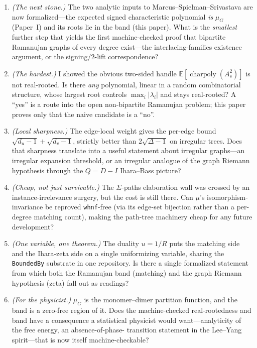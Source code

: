 \documentclass[11pt]{article}
\newcommand{\lean}[1]{{\def\_{\textunderscore\allowbreak}\texttt{#1}}}
\begin{document}
\begin{enumerate}\itemsep3pt
\item[\textbf{Q1}] \emph{(The next stone.)} The two analytic inputs to
  Marcus--Spielman--Srivastava are now formalized---the expected signed
  characteristic polynomial \emph{is} $\mu_G$ (Paper~I) and its roots lie in the
  band (this paper). What is the \emph{smallest} further step that yields the first
  machine-checked proof that bipartite Ramanujan graphs of every degree exist---the
  interlacing-families existence argument, or the signing/$2$-lift correspondence?
\item[\textbf{Q2}] \emph{(The hardest.)} I showed the obvious two-sided handle
  $\mathbb{E}[\operatorname{charpoly}(A_s^2)]$ is not real-rooted. Is there
  \emph{any} polynomial, linear in a random combinatorial structure, whose largest
  root controls $\max_i|\lambda_i|$ and stays real-rooted? A ``yes'' is a route into
  the open non-bipartite Ramanujan problem; this paper proves only that the naive
  candidate is a ``no''.
\item[\textbf{Q3}] \emph{(Local sharpness.)} The edge-local weight gives the
  per-edge bound $\sqrt{d_u-1}+\sqrt{d_v-1}$, strictly better than $2\sqrt{\Delta-1}$
  on irregular trees. Does that sharpness translate into a useful statement about
  irregular graphs---an irregular expansion threshold, or an irregular analogue of
  the graph Riemann hypothesis through the $Q=D-I$ Ihara--Bass picture?
\item[\textbf{Q4}] \emph{(Cheap, not just survivable.)} The $\Sigma$-paths
  elaboration wall was crossed by an instance-irrelevance surgery, but the cost is
  still there. Can $\mu$'s isomorphism-invariance be reproved \lean{whnf}-free (via
  its edge-set bijection rather than a per-degree matching count), making the
  path-tree machinery cheap for any future development?
\item[\textbf{Q5}] \emph{(One variable, one theorem.)} The duality $u=1/R$ puts the
  matching side and the Ihara-zeta side on a single uniformizing variable, sharing
  the \lean{BoundedBy} substrate in one repository. Is there a single formalized
  statement from which both the Ramanujan band (matching) and the graph Riemann
  hypothesis (zeta) fall out as readings?
\item[\textbf{Q6}] \emph{(For the physicist.)} $\mu_G$ is the monomer--dimer
  partition function, and the band is a zero-free region of it. Does the
  machine-checked real-rootedness and band have a consequence a statistical
  physicist would want---analyticity of the free energy, an absence-of-phase-%
  transition statement in the Lee--Yang spirit---that is now itself
  machine-checkable?
\end{enumerate}
\end{document}
